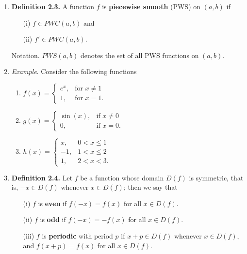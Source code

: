\begin{enumerate}
\item \textbf{Definition 2.3.} A function $f$ is \textbf{piecewise smooth} (PWS) on $(a, b)$ if
\begin{itemize}
\item[(i)] $f \in PWC(a, b)$ and
\item[(ii)] $f' \in PWC(a, b)$.
\end{itemize}

Notation. $PWS(a, b)$ denotes the set of all PWS functions on $(a, b)$.



\item \textit{Example}. Consider the following functions

\begin{enumerate}
    \item $
    f(x) = 
    \begin{cases}
        e^{x}, & \text{for } x\neq 1 \\
        1, & \text{for } x = 1.
    \end{cases}
    $

    \vspace{20pt}
    \item $
    g(x) = 
    \begin{cases}
        \sin(x), & \text{if } x\neq 0 \\
        0, & \text{if } x = 0.
    \end{cases}
    $

    \vspace{20pt}
    \item $
    h(x) = 
    \begin{cases}
        x, &  0 < x \leq 1 \\
        -1, &  1 < x \leq 2 \\
        1, & 2 < x < 3.
    \end{cases}
    $
\end{enumerate}


\newpage 

\item \textbf{Definition 2.4.} Let $f$ be a function whose domain $D(f)$ is symmetric, that is, $-x \in D(f )$ whenever $x \in D(f )$; then we say that 
\begin{itemize}
\item[(i)] $f$ is \textbf{even} if $f (-x) = f (x) $ for all $x \in D(f )$.
\item[(ii)] $f$ is \textbf{odd} if $f (-x) = -f (x)$ for all $x \in D(f )$.
\item[(iii)] $f$ is \textbf{periodic} with period $p$ if $x + p \in D(f )$ whenever $x \in D(f )$, and
$f (x + p) = f (x)$ for all $x \in D(f )$.
\end{itemize}



\end{enumerate}
